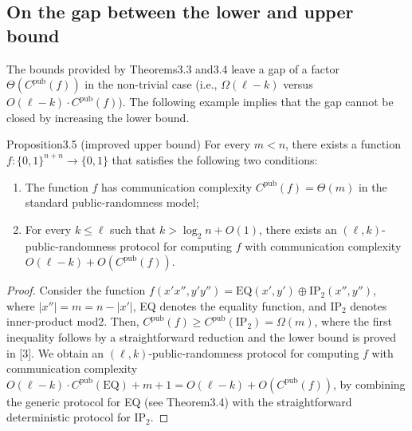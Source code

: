 \subsection*{On the gap between the lower and upper bound}
The bounds provided by Theorems3.3 and3.4 leave a gap of a factor $\Theta(C^{\mathrm{pub}}(f))$ in the non-trivial case (i.e., $\Omega(\ell-k)$ versus $O(\ell-k)\cdot C^{\mathrm{pub}}(f)$). The following example implies that the gap cannot be closed by increasing the lower bound.
\begin{authorclaim}{Proposition3.5 (improved upper bound)}
For every $m<n$, there exists a function $f:\{0,1\}^{n+n}\to\{0,1\}$ that satisfies the following two conditions:
\begin{enumerate}
\item The function $f$ has communication complexity $C^{\mathrm{pub}}(f)=\Theta(m)$ in the standard public-randomness model;
\item For every $k\le\ell$ such that $k>\log_2n+O(1)$, there exists an $(\ell,k)$-public-randomness protocol for computing $f$ with communication complexity $O(\ell-k)+O(C^{\mathrm{pub}}(f))$.
\end{enumerate}
\end{authorclaim}
\begin{proof}
Consider the function $f(x'x'',y'y'')=\mathrm{EQ}(x',y')\oplus\mathrm{IP}_2(x'',y'')$, where $|x''|=m=n-|x'|$, EQ denotes the equality function, and $\mathrm{IP}_2$ denotes inner-product mod2. Then, $C^{\mathrm{pub}}(f)\ge C^{\mathrm{pub}}(\mathrm{IP}_2)=\Omega(m)$, where the first inequality follows by a straightforward reduction and the lower bound is proved in [3]. We obtain an $(\ell,k)$-public-randomness protocol for computing $f$ with communication complexity $O(\ell-k)\cdot C^{\mathrm{pub}}(\mathrm{EQ})+m+1=O(\ell-k)+O(C^{\mathrm{pub}}(f))$, by combining the generic protocol for EQ (see Theorem3.4) with the straightforward deterministic protocol for $\mathrm{IP}_2$.
\end{proof}
